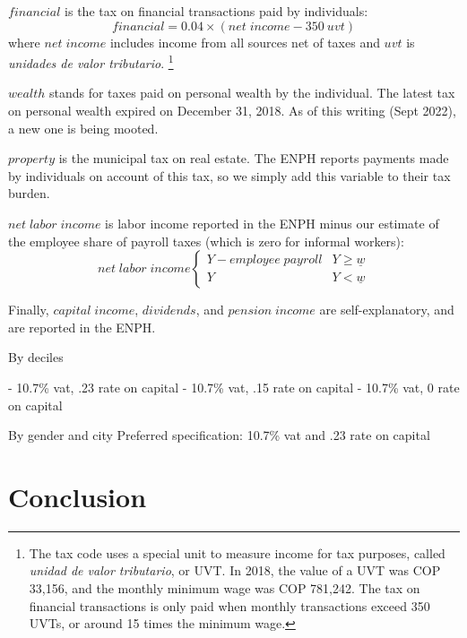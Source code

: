 \documentclass[12pt]{article}
\begin{document}
$financial$ is the tax on financial transactions paid by individuals:
\begin{equation}
  financial=0.04 \times (net \;income -350\ uvt)
\end{equation}
where $net \;income$ includes income from all sources net of taxes
and $uvt$ is \textit{unidades de valor tributario}.
\footnote{The tax code uses a special unit to measure income for tax purposes,
called \textit{unidad de valor tributario}, or UVT.
In 2018, the value of a UVT was COP 33,156,
and the monthly minimum wage was COP 781,242.
The tax on financial transactions is only paid
when monthly transactions exceed 350 UVTs,
or around 15 times the minimum wage.}

$wealth$ stands for taxes paid on personal wealth by the individual.
The latest tax on personal wealth expired on December 31, 2018.
As of this writing (Sept 2022), a new one is being mooted.

$property$ is the municipal tax on real estate.
The ENPH reports payments made by individuals on account of this tax,
so we simply add this variable to their tax burden.

$net \; labor \;income$ is labor income reported in the ENPH
minus our estimate of the employee share of payroll taxes
(which is zero for informal workers):
\begin{equation}
net \; labor \;income
  \begin{cases}
	Y - employee \; payroll& Y \geq \underline{w} \\
	Y &  Y < \underline{w}
  \end{cases}
\end{equation}

Finally, $capital \; income$, $dividends$, and $pension \; income$
are self-explanatory, and are reported in the ENPH.

\iffalse
[[someone:
    What does this next passage mean?
    It looks like it got mangled.
    --jbb]]
\fi

By deciles

- 10.7\% vat, .23 rate on capital
- 10.7\% vat, .15 rate on capital
- 10.7\% vat,  0 rate on capital

By gender and city
Preferred specification: 10.7\% vat and .23 rate on capital

\section{Conclusion}
\end{document}
